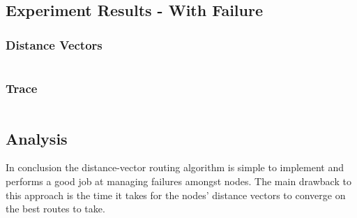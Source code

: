 \documentclass[fleqn,11pt]{article}
\begin{document}
  \subsection{Experiment Results - With Failure}
  \subsubsection{Distance Vectors}
    \begin{verbatim}
    \end{verbatim}
  \subsubsection{Trace}
    \begin{verbatim}
    \end{verbatim}

  \subsection{Analysis}
    In conclusion the distance-vector routing algorithm is simple to implement and performs a good job at managing failures amongst nodes.
    The main drawback to this approach is the time it takes for the nodes' distance vectors to converge on the best routes to take.
\end{document}
